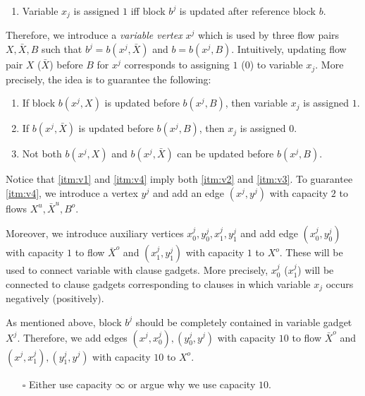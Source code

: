 \documentclass[fontsize=11pt,paper=a4]{book}
\begin{document}
\begin{enumerate}[label=(V\arabic*)]
\item\label{itm:v1}
Variable \(x_j\) is assigned \(1\) iff block \(b^j\) is updated after reference block \(b\).
\end{enumerate}

Therefore, we introduce a \emph{variable vertex} \(x^j\) which is used by three flow pairs \(X,\bar{X},B\) such that \(b^j=b(x^j,\bar{X})\) and \(b=b(x^j,B)\).
Intuitively, updating flow pair \(X\) (\(\bar{X}\)) before \(B\) for \(x^j\) corresponds to assigning \(1\) (\(0\)) to variable \(x_j\).
More precisely, the idea is to guarantee the following:

\begin{enumerate}[label=(V\arabic*),start=2]
\item\label{itm:v2}
If block \(b(x^j,X)\) is updated before \(b(x^j,B)\), then variable \(x_j\) is assigned \(1\).
\item\label{itm:v3}
If \(b(x^j,\bar{X})\) is updated before \(b(x^j,B)\), then \(x_j\) is assigned \(0\).
\item\label{itm:v4}
Not both \(b(x^j,X)\) and \(b(x^j,\bar{X})\) can be updated before \(b(x^j,B)\).
\end{enumerate}

Notice that \ref{itm:v1} and \ref{itm:v4} imply both \ref{itm:v2} and \ref{itm:v3}.
To guarantee \ref{itm:v4}, we introduce a vertex \(y^j\) and add an edge \((x^j,y^j)\) with capacity \(2\) to flows \(X^u,\bar{X}^u,B^o\).

Moreover, we introduce auxiliary vertices \(x_0^j,y_0^j,x_1^j,y_1^j\) and add edge \((x_0^j,y_0^j)\) with capacity \(1\) to flow \(\bar{X}^o\) and \((x_1^j,y_1^j)\) with capacity \(1\) to \(X^o\).
These will be used to connect variable with clause gadgets.
More precisely, \(x_0^j\) (\(x_1^j\)) will be connected to clause gadgets corresponding to clauses in which variable \(x_j\) occurs negatively (positively).

As mentioned above, block \(b^j\) should be completely contained in variable gadget \(X^j\).
Therefore, we add edges \((x^j,x_0^j),(y_0^j,y^j)\) with capacity \(10\) to flow \(\bar{X}^o\) and \((x^j,x_1^j),(y_1^j,y^j)\) with capacity \(10\) to \(X^o\).

\begin{itemize}
\item[{$\square$}] Either use capacity \(\infty\) or argue why we use capacity \(10\).
\end{itemize}
\end{document}

